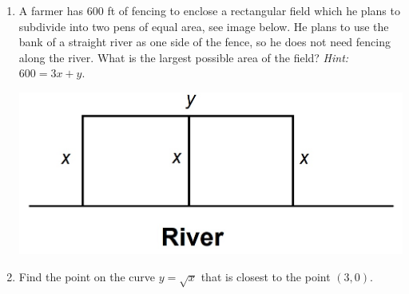 \documentclass[12pt]{article}
\begin{document}
\begin{enumerate}
\item A farmer has 600 ft of fencing to enclose a rectangular field which he plans to subdivide into two pens of equal area, see image below. He plans to use the bank of a straight river as one side of the fence, so he does not need fencing along the river. What is the largest possible area of the field? \emph{Hint:} $600=3x+y$.
    \begin{center}
    \includegraphics[scale=0.25]{Images/S23M241MT3pic1.jpg}
    \end{center}

\pagebreak

\item Find the point on the curve $y=\sqrt{x}$ that is closest to the point $(3,0).$
\end{enumerate}
\end{document}
